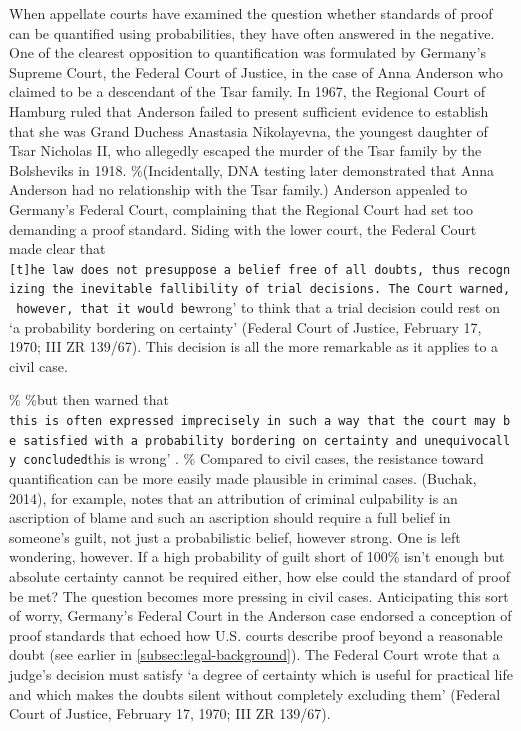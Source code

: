 \documentclass[10pt,dvipsnames,enabledeprecatedfontcommands]{scrartcl}
\begin{document}
When appellate courts have examined the question whether standards of
proof can be quantified using probabilities, they have often answered in
the negative. One of the clearest opposition to quantification was
formulated by Germany's Supreme Court, the Federal Court of Justice, in
the case of Anna Anderson who claimed to be a descendant of the Tsar
family. In 1967, the Regional Court of Hamburg ruled that Anderson
failed to present sufficient evidence to establish that she was Grand
Duchess Anastasia Nikolayevna, the youngest daughter of Tsar Nicholas
II, who allegedly escaped the murder of the Tsar family by the
Bolsheviks in 1918. \%(Incidentally, DNA testing later demonstrated that
Anna Anderson had no relationship with the Tsar family.) Anderson
appealed to Germany's Federal Court, complaining that the Regional Court
had set too demanding a proof standard. Siding with the lower court, the
Federal Court made clear that
\texttt{{[}t{]}he\ law\ does\ not\ presuppose\ a\ belief\ free\ of\ all\ doubts\textquotesingle{},\ thus\ recognizing\ the\ inevitable\ fallibility\ of\ trial\ decisions.\ The\ Court\ warned,\ however,\ that\ it\ would\ be}wrong'
to think that a trial decision could rest on `a probability bordering on
certainty' (Federal Court of Justice, February 17, 1970; III ZR 139/67).
This decision is all the more remarkable as it applies to a civil case.

\% \%but then warned that
\texttt{this\ is\ often\ expressed\ imprecisely\ in\ such\ a\ way\ that\ the\ court\ may\ be\ satisfied\ with\ a\ probability\ bordering\ on\ certainty\textquotesingle{}\ and\ unequivocally\ concluded}this
is wrong' . \% Compared to civil cases, the resistance toward
quantification can be more easily made plausible in criminal cases.
(Buchak, 2014), for example, notes that an attribution of criminal
culpability is an ascription of blame and such an ascription should
require a full belief in someone's guilt, not just a probabilistic
belief, however strong. One is left wondering, however. If a high
probability of guilt short of 100\% isn't enough but absolute certainty
cannot be required either, how else could the standard of proof be met?
The question becomes more pressing in civil cases. Anticipating this
sort of worry, Germany's Federal Court in the Anderson case endorsed a
conception of proof standards that echoed how U.S. courts describe proof
beyond a reasonable doubt (see earlier in
\ref{subsec:legal-background}). The Federal Court wrote that a judge's
decision must satisfy `a degree of certainty which is useful for
practical life and which makes the doubts silent without completely
excluding them' (Federal Court of Justice, February 17, 1970; III ZR
139/67).
\end{document}
